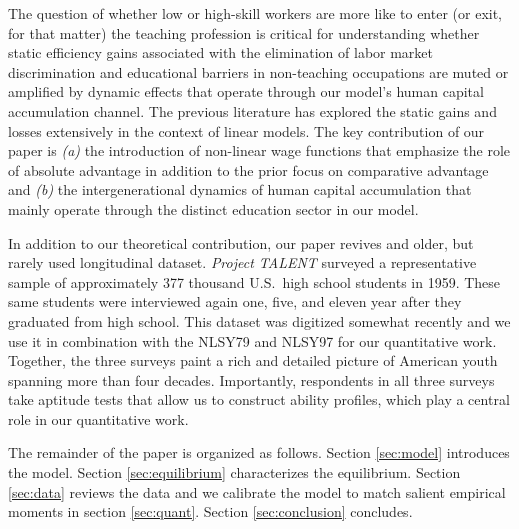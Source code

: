 \documentclass[onehalfspacing,11pt]{article}
\begin{document}
The question of whether low or high-skill workers are more like to enter (or exit, for that matter) the teaching profession is critical for understanding whether static efficiency gains associated with the elimination of labor market discrimination and educational barriers in non-teaching occupations are muted or amplified by dynamic effects that operate through our model's human capital accumulation channel. The previous literature has explored the static gains and losses extensively in the context of linear models. The key contribution of our paper is {\it (a)} the introduction of non-linear wage functions that emphasize the role of absolute advantage in addition to the prior focus on comparative advantage and {\it (b)} the intergenerational dynamics of human capital accumulation that mainly operate through the distinct education sector in our model.

In addition to our theoretical contribution, our paper revives and older, but rarely used longitudinal dataset. {\it Project TALENT} surveyed a representative sample of approximately 377 thousand U.S.~high school students in 1959. These same students were interviewed again one, five, and eleven year after they graduated from high school. This dataset was digitized somewhat recently and we use it in combination with the NLSY79 and NLSY97 for our quantitative work. Together, the three surveys paint a rich and detailed picture of American youth spanning more than four decades. Importantly, respondents in all three surveys take aptitude tests that allow us to construct ability profiles, which play a central role in our quantitative work.


The remainder of the paper is organized as follows. Section \ref{sec:model} introduces the model. Section \ref{sec:equilibrium} characterizes the equilibrium. Section \ref{sec:data} reviews the data and we calibrate the model to match salient empirical moments in section \ref{sec:quant}. Section \ref{sec:conclusion} concludes.
\end{document}
